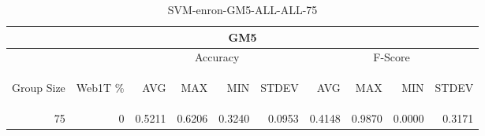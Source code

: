 \begin{center}
\begin{table}[htbp] 
 \begin{center}
\begin{tabular}{ | r | r | r | r | r | r | r | r | r | r |}
\hline
\multicolumn{10}{|c|}{GM5}\\
\hline
 & & \multicolumn{4}{|c|}{Accuracy} & \multicolumn{4}{|c|}{F-Score}\\ \cline{3-10}
\begin{sideways}Group Size\end{sideways} & \begin{sideways}Web1T \%\end{sideways} & \begin{sideways}AVG\end{sideways} & \begin{sideways}MAX\end{sideways} & \begin{sideways}MIN\end{sideways} & \begin{sideways}STDEV\end{sideways} & \begin{sideways}AVG\end{sideways} & \begin{sideways}MAX\end{sideways} & \begin{sideways}MIN\end{sideways} & \begin{sideways}STDEV\end{sideways}\\
\hline
\multirow{0}{*}{75}
 & 0 & 0.5211 & 0.6206 & 0.3240 & 0.0953 & 0.4148 & 0.9870 & 0.0000 & 0.3171\\ \cline{2-10}
\hline
\end{tabular}
\caption{SVM-enron-GM5-ALL-ALL-75}
\label{table:SVM-enron-GM5-ALL-ALL-75}
\end{center}
 \end{table}
\end{center}

